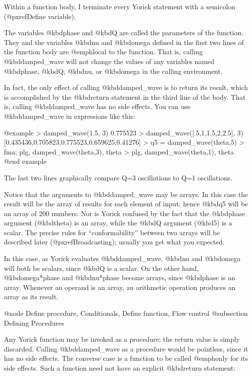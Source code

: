 {Within a function body, I terminate every Yorick statement with a
semicolon (@pxref{Define variable}).

The variables @kbd{phase} and @kbd{Q} are called the parameters of the
function.  They and the variables @kbd{nu} and @kbd{omega} defined in
the first two lines of the function body are @emph{local} to the
function.  That is, calling @kbd{damped_wave} will not change the
values of any variables named @kbd{phase}, @kbd{Q}, @kbd{nu}, or
@kbd{omega} in the calling environment.

In fact, the only effect of calling @kbd{damped_wave} is to return its
result, which is accomplished by the @kbd{return} statement in the
third line of the body.  That is, calling @kbd{damped_wave} has no side
effects.  You can use @kbd{damped_wave} in expressions like this:

@example
> damped_wave(1.5, 3)
0.775523
> damped_wave([.5,1,1.5,2,2.5], 3)
[0.435436,0.705823,0.775523,0.659625,0.41276]
> q5 = damped_wave(theta,5)
> fma; plg, damped_wave(theta,3), theta
> plg, damped_wave(theta,1), theta
@end example

The last two lines graphically compare Q=3 oscillations to Q=1
oscillations.

Notice that the arguments to @kbd{damped_wave} may be arrays.  In this
case the result will be the array of results for each element of
input; hence @kbd{q5} will be an array of 200 numbers.  Nor is Yorick
confused by the fact that the @kbd{phase} argument (@kbd{theta}) is an
array, while the @kbd{Q} argument (@kbd{5}) is a scalar.  The precise
rules for ``conformability'' between two arrays will be described
later (@pxref{Broadcasting}); usually you get what you expected.

In this case, as Yorick evaluates @kbd{damped_wave}, @kbd{nu} and
@kbd{omega} will both be scalars, since @kbd{Q} is a scalar.  On the
other hand, @kbd{omega*phase} and @kbd{nu*phase} become arrays, since
@kbd{phase} is an array.  Whenever an operand is an array, an
arithmetic operation produces an array as its result.


@node Define procedure, Conditionals, Define function, Flow control
@subsection Defining Procedures

Any Yorick function may be invoked as a procedure; the return value is
simply discarded.  Calling @kbd{damped_wave} as a procedure would be
pointless, since it has no side effects.  The converse case is a
function to be called @emph{only} for its side effects.  Such a
function need not have an explicit @kbd{return} statement:

}
